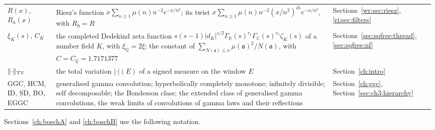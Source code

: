 {\begin{longtable}{@{}p{}p{}p{}@{}}
$R(x)$, $R_h(x)$ & \raggedright Riesz's function ${x\sum_{n\ge1}\mu(n)n^{-2}e^{-x/n^2}}$; its twist ${x\sum_{n\ge1}\mu(n)n^{-2}(x/n^2)^{ih}e^{-x/n^2}}$, with ${R_0=R}$ & \raggedright Sections~\ref{wr:sec:riesz}, \ref{ri:sec:filters}\tabularnewline
$\xi_K(s)$, $C_K$ & \raggedright the completed Dedekind zeta function ${s(s-1)|d_K|^{s/2}\Gamma_{\mathbb R}(s)^{r_1}\Gamma_{\mathbb C}(s)^{r_2}\zeta_K(s)}$ of a number field $K$, with ${\xi_{\mathbb Q}=2\xi}$; the constant of ${\sum_{N(\mathfrak a)\le x}\mu(\mathfrak a)^2/N(\mathfrak a)}$, with ${C=C_{\mathbb Q}=1.7171377}$ & \raggedright Sections~\ref{sec:sqfree:thread}, \ref{sec:sqfree:nf}\tabularnewline
$\lVert \cdot\rVert_{\mathrm{TV}}$ & \raggedright the total variation $|\cdot|(E)$ of a signed measure on the window $E$ & \raggedright Section~\ref{ch:intro}\tabularnewline
GGC, HCM, ID, SD, BO, EGGC & \raggedright generalised gamma convolution; hyperbolically completely monotone; infinitely divisible; self decomposable; the Bondesson class; the extended class of generalised gamma convolutions, the weak limits of convolutions of gamma laws and their reflections & \raggedright Section~\ref{ch:ggc}, Section~\ref{sec:ch3:hierarchy}\tabularnewline
\bottomrule
\end{longtable}}

Sections~\ref{ch:boschA} and \ref{ch:boschB} use the following notation.

